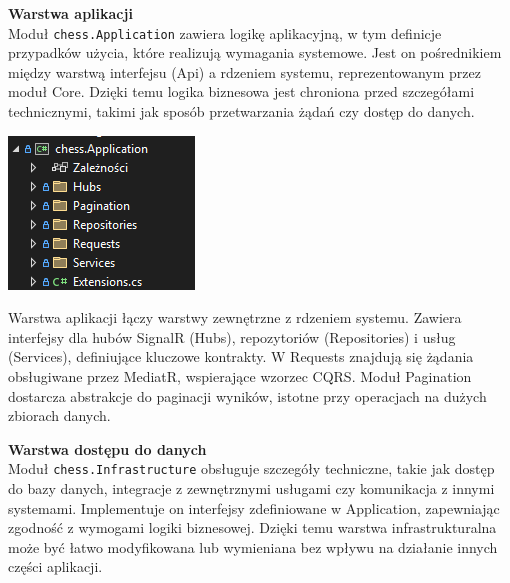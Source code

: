 \documentclass[12pt,a4paper]{article}
\begin{document}
\noindent \textbf{Warstwa aplikacji}\\
Moduł \texttt{chess.Application} zawiera logikę aplikacyjną, w tym definicje przypadków użycia, które realizują wymagania systemowe. Jest on pośrednikiem między warstwą interfejsu (Api) a rdzeniem systemu, reprezentowanym przez moduł Core. Dzięki temu logika biznesowa jest chroniona przed szczegółami technicznymi, takimi jak sposób przetwarzania żądań czy dostęp do danych.

\vspace{0.5cm}
\begin{minipage}[t]{0.45\textwidth}
    \vspace{0pt}
    \centering
    \includegraphics[width=\linewidth]{images/struktura_back_application.png} 
\end{minipage}
\hfill
\begin{minipage}[t]{0.45\textwidth}
    \vspace{0pt}
    \justifying \noindent
    Warstwa aplikacji łączy warstwy zewnętrzne z rdzeniem systemu. Zawiera interfejsy dla hubów SignalR (Hubs), repozytoriów (Repositories) i usług (Services), definiujące kluczowe kontrakty. W Requests znajdują się żądania obsługiwane przez MediatR, wspierające wzorzec CQRS. Moduł Pagination dostarcza abstrakcje do paginacji wyników, istotne przy operacjach na dużych zbiorach danych.
\end{minipage}

\newpage

\noindent \textbf{Warstwa dostępu do danych}\\
Moduł \texttt{chess.Infrastructure} obsługuje szczegóły techniczne, takie jak dostęp do bazy danych, integracje z zewnętrznymi usługami czy komunikacja z innymi systemami. Implementuje on interfejsy zdefiniowane w Application, zapewniając zgodność z wymogami logiki biznesowej. Dzięki temu warstwa infrastrukturalna może być łatwo modyfikowana lub wymieniana bez wpływu na działanie innych części aplikacji.
\end{document}

